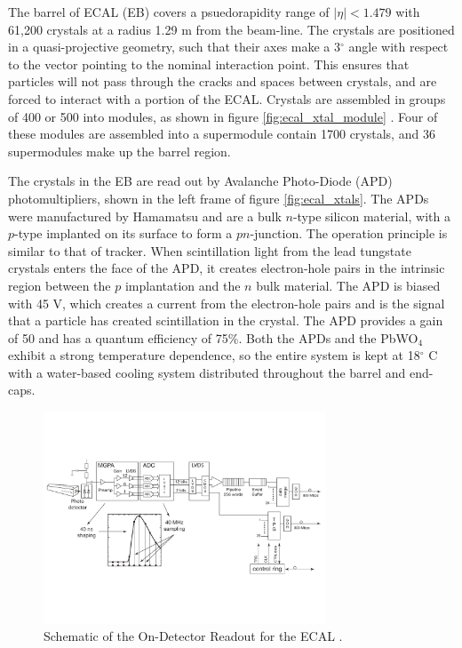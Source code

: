 \par The barrel of ECAL (EB) covers a psuedorapidity range of
$|\eta|<1.479$ with 61,200 crystals at a radius 1.29 m from the
beam-line.  The crystals are positioned in a quasi-projective geometry,
such that their axes make a 3$^{\circ}$ angle with respect to the
vector pointing to the nominal interaction point.  This ensures that
particles will not pass through the cracks and spaces between crystals,
and are forced to interact with a portion of the ECAL. Crystals are
assembled in groups of 400 or 500 into modules, as shown in figure
\ref{fig:ecal_xtal_module} .  Four of these modules are assembled into
a supermodule contain 1700 crystals, and 36 supermodules make up the
barrel region. 

\par The crystals in the EB are read out by Avalanche Photo-Diode (APD)
photomultipliers, shown in the left frame of figure
\ref{fig:ecal_xtals}.  The APDs were manufactured by Hamamatsu and are
a bulk $n$-type silicon material, with a $p$-type implanted on its
surface to form a $pn$-junction.  The operation principle is similar
to that of tracker.  When scintillation light from the lead tungstate
crystals enters the face of the APD, it creates electron-hole pairs in
the intrinsic region between the $p$ implantation and the $n$ bulk
material.  The APD is biased with 45 V, which creates a current from
the electron-hole pairs and is the signal that a particle has created
scintillation in the crystal.  The APD provides a gain of 50 and has a
quantum efficiency of 75$\%$.  Both the APDs and the PbWO$_{4}$
exhibit a strong temperature dependence, so the entire system is kept
at 18$^{\circ}$ C with a water-based cooling system distributed
throughout the barrel and end-caps.  

\begin{figure}[h]
   \centering
  \includegraphics[width=0.75\textwidth]{Figures/CMS_Diagrams/ECAL__OnDetectorReadOut.pdf}
  \caption{Schematic of the On-Detector Readout for the ECAL
    \cite{CMS:CMS_Machine_Chatrchyan:2008aa}. } \label{fig:ecal_readout} 
\end{figure}


